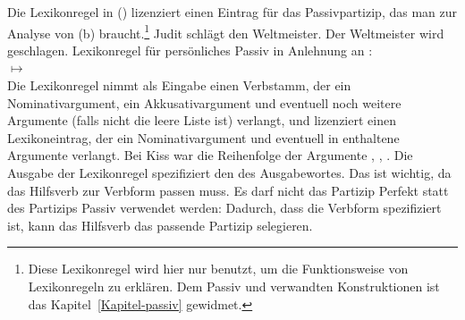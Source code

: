 Die Lexikonregel in () lizenziert einen Eintrag für das Passivpartizip,
das man zur Analyse von (b) braucht.\footnote{
  Diese Lexikonregel wird hier nur benutzt, um die Funktionsweise von Lexikonregeln zu erklären.
  Dem Passiv und verwandten Konstruktionen ist das Kapitel~\ref{Kapitel-passiv} gewidmet.%
}
\eal
\ex Judit schlägt den Weltmeister.
\ex Der Weltmeister wird geschlagen.
\zl
\ea
\label{pass-lr-mlr}
Lexikonregel für persönliches Passiv in Anlehnung an \citet[276]{Kiss92}:\\
 $\mapsto$ \\[1mm]
\mbox{}\hfill{}
\z
Die Lexikonregel nimmt als Eingabe einen Verbstamm, der ein Nominativargument, ein Akkusativargument
und eventuell noch weitere Argumente (falls  
nicht die leere Liste ist) verlangt, und lizenziert einen Lexikoneintrag, der ein Nominativargument 
und eventuell in  enthaltene Argumente verlangt. Bei Kiss war die Reihenfolge der Argumente
, , . Die Ausgabe der Lexikonregel spezifiziert
den \vformw des Ausgabewortes. Das ist wichtig, da das Hilfsverb zur Verbform passen muss. Es darf \zb
nicht das Partizip Perfekt statt des Partizips Passiv verwendet werden:
\eal
{}
\zl
Dadurch, dass die Verbform spezifiziert ist, kann das Hilfsverb das passende Partizip selegieren.


